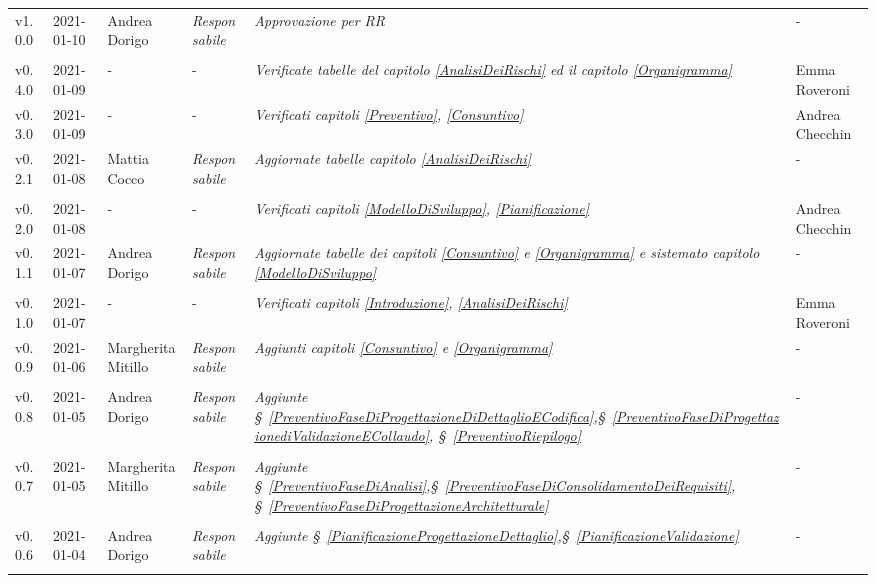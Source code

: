 {\begin{center}
\begin{longtable}[c]{|p{2cm-1\tabcolsep}|p{2cm}|p{3cm-2\tabcolsep}|p{}|p{}|p{4cm-2\tabcolsep}|}
		\hline
		\centering v1.0.0 & 2021-01-10 & Andrea Dorigo & \centering \textit{Responsabile} & \textit{Approvazione per RR} & \centering -  \\ \tabularnewline
		\hline
		\centering v0.4.0 & 2021-01-09 & \centering - & \centering - & \textit{Verificate tabelle del capitolo \ref{AnalisiDeiRischi} ed il capitolo \ref{Organigramma}} & Emma Roveroni  \\
		\hline
		\centering v0.3.0 & 2021-01-09 & \centering - & \centering - & \textit{Verificati capitoli \ref{Preventivo}, \ref{Consuntivo}} & Andrea Checchin \\
		\hline
		\centering v0.2.1 & 2021-01-08 & Mattia Cocco & \centering \textit{Responsabile} & \textit{Aggiornate tabelle capitolo  \ref{AnalisiDeiRischi}} & \centering -  \\ \tabularnewline
		\hline
		\centering v0.2.0 & 2021-01-08 & \centering - & \centering - & \textit{Verificati capitoli \ref{ModelloDiSviluppo}, \ref{Pianificazione}} & Andrea Checchin  \\
		\hline
		\centering v0.1.1 & 2021-01-07 & Andrea Dorigo & \centering \textit{Responsabile} & \textit{Aggiornate tabelle dei capitoli \ref{Consuntivo} e \ref{Organigramma} e sistemato capitolo \ref{ModelloDiSviluppo}} & \centering -  \\ \tabularnewline
		\hline
		\centering v0.1.0 & 2021-01-07 & \centering - & \centering - & 	\textit{Verificati capitoli \ref{Introduzione}, \ref{AnalisiDeiRischi} } & Emma Roveroni  \\
		\hline
		\centering v0.0.9 & 2021-01-06 & Margherita Mitillo & \centering \textit{Responsabile} & \textit{Aggiunti capitoli \ref{Consuntivo} e \ref{Organigramma}} & \centering -  \\ \tabularnewline
		\hline
		\centering v0.0.8 & 2021-01-05 & Andrea Dorigo & \centering \textit{Responsabile}  & \textit{Aggiunte \S~\ref{PreventivoFaseDiProgettazioneDiDettaglioECodifica},\S~\ref{PreventivoFaseDiProgettazionediValidazioneECollaudo}, \S~\ref{PreventivoRiepilogo} } & \centering -  \\ \tabularnewline
		\hline
		\centering v0.0.7 & 2021-01-05 & Margherita Mitillo & \centering \textit{Responsabile} & \textit{Aggiunte \S~\ref{PreventivoFaseDiAnalisi},\S~\ref{PreventivoFaseDiConsolidamentoDeiRequisiti}, \S~\ref{PreventivoFaseDiProgettazioneArchitetturale} } & \centering -  \\ \tabularnewline
		\hline
		\centering v0.0.6 & 2021-01-04 & Andrea Dorigo & \centering \textit{Responsabile} & \textit{Aggiunte \S~\ref{PianificazioneProgettazioneDettaglio},\S~\ref{PianificazioneValidazione}} & \centering -  \\ \tabularnewline

\end{longtable}
\end{center}}
